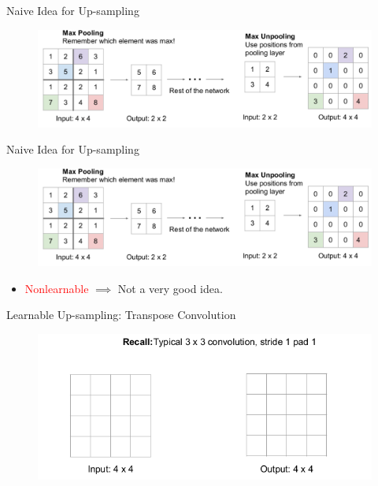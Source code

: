 \documentclass[aspectratio=169]{beamer}
\begin{document}
\begin{frame}{Naive Idea for Up-sampling}
\begin{center}
    \begin{figure}
    \includegraphics[scale=.35]{demo/figs/unpool1.png}
\end{figure}
\end{center}
\end{frame}

\begin{frame}{Naive Idea for Up-sampling}
\begin{center}
    \begin{figure}
    \includegraphics[scale=.35]{demo/figs/unpool1.png}
\end{figure}
\end{center}
\begin{itemize}
    \item \textcolor{red}{Nonlearnable}
$\implies$ Not a very good idea. 
\end{itemize}
\end{frame}

\begin{frame}{Learnable Up-sampling: Transpose Convolution}
\begin{figure}
    \centering
    \includegraphics[scale=.4]{demo/figs/tconv1.png}
\end{figure}
\end{frame}
\end{document}
